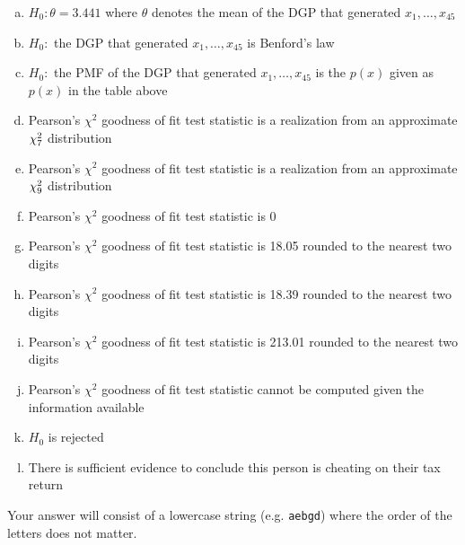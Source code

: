 \documentclass[12pt,landscape]{article}
\newcommand{\instr}{\small Your answer will consist of a lowercase string (e.g. \texttt{aebgd}) where the order of the letters does not matter. \normalsize}
\begin{document}
\vspace{-0.2cm}\benum{} 
\begin{enumerate}[(a)]
\item $H_0: \theta = 3.441$ where $\theta$ denotes the mean of the DGP that generated $x_1, \ldots, x_{45}$
\item $H_0:$ the DGP that generated $x_1, \ldots, x_{45}$ is Benford's law
\item $H_0:$ the PMF of the DGP that generated $x_1, \ldots, x_{45}$ is the $p(x)$ given as $p(x)$ in the table above
\item Pearson's $\chi^2$ goodness of fit test statistic is a realization from an approximate $\chi^2_{7}$ distribution
\item Pearson's $\chi^2$ goodness of fit test statistic is a realization from an approximate $\chi^2_{9}$ distribution

\item Pearson's $\chi^2$ goodness of fit test statistic is 0
\item Pearson's $\chi^2$ goodness of fit test statistic is 18.05 rounded to the nearest two digits
\item Pearson's $\chi^2$ goodness of fit test statistic is 18.39 rounded to the nearest two digits
\item Pearson's $\chi^2$ goodness of fit test statistic is 213.01 rounded to the nearest two digits
\item Pearson's $\chi^2$ goodness of fit test statistic cannot be computed given the information available

\item $H_0$ is rejected
\item There is sufficient evidence to conclude this person is cheating on their tax return
\end{enumerate}
\eenum\instr\pagebreak
\end{document}
